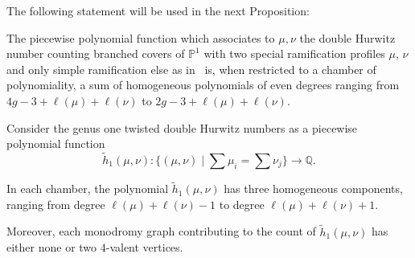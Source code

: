  
The following statement will be used in the next Proposition:
\begin{coro}\label{cor-joh}
  The piecewise polynomial function which associates to $\mu,\nu$ the double Hurwitz number counting branched covers of $\mathbb{P}^1$ with two special ramification profiles $\mu$, $\nu$ and only simple ramification else as in~\cite{GJV05, CJM11} is, when restricted to a chamber of polynomiality, a sum of homogeneous polynomials of even degrees ranging from $ 4g-3+\ell(\mu)+\ell(\nu)$ to $2g-3+\ell(\mu)+\ell(\nu)$.
\end{coro}
 
  \begin{prop}\label{prop-ppingenus1}
 Consider the genus one twisted double Hurwitz numbers as a piecewise polynomial function 
$$\tilde{h}_1(\mu,\nu):\Big\{(\mu,\nu) \mid \sum \mu_i=\sum\nu_j\Big\} \longrightarrow\mathbb{Q}.$$ 

In each chamber, the polynomial $\tilde{h}_1(\mu,\nu)$ has three homogeneous components, ranging from degree $\ell(\mu)+\ell(\nu)-1$ to degree $\ell(\mu)+\ell(\nu)+1$.

Moreover, each monodromy graph contributing to the count of  $\tilde{h}_1(\mu,\nu)$ has either none or two $4$-valent vertices.
 \end{prop}
 
